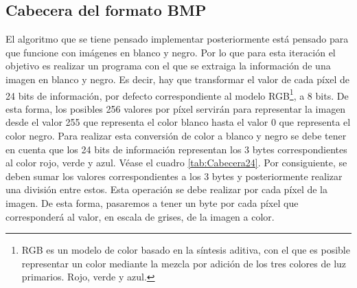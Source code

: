 \subsection{Cabecera del formato BMP}

El algoritmo que se tiene pensado implementar posteriormente está pensado para que funcione con imágenes en blanco y negro. Por lo que para esta iteración el objetivo es realizar un programa con el que se extraiga la información de una imagen en blanco y negro. Es decir, hay que transformar el valor de cada píxel de 24 bits de información, por defecto correspondiente al modelo \ac{RGB}\footnote{RGB es un modelo de color basado en la síntesis aditiva, con el que es posible representar un color mediante la mezcla por adición de los tres colores de luz primarios. Rojo, verde y azul.}, a 8 bits. De esta forma, los posibles 256 valores por píxel servirán para representar la imagen desde el valor 255 que representa el color blanco hasta el valor 0 que representa el color negro. Para realizar esta conversión de color a blanco y negro se debe tener en cuenta que los 24 bits de información representan los 3 bytes correspondientes al color rojo, verde y azul. Véase el cuadro \ref{tab:Cabecera24}. Por consiguiente, se deben sumar los valores correspondientes a los 3 bytes y posteriormente realizar una división entre estos. Esta operación se debe realizar por cada píxel de la imagen. De esta forma, pasaremos a tener un byte por cada píxel que corresponderá al valor, en escala de grises, de la imagen a color.

